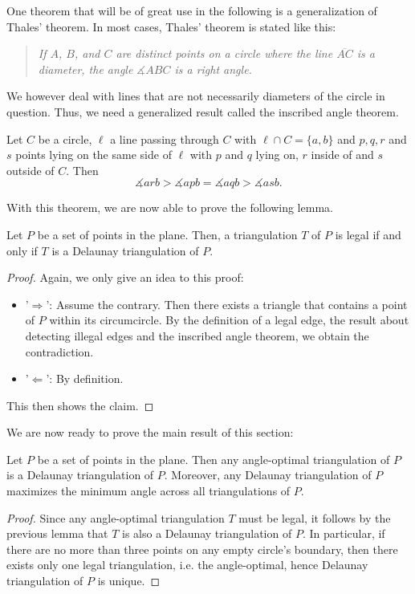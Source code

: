     One theorem that will be of great use in the following is a generalization of Thales' theorem. In most cases, Thales' theorem is stated like this:
    \begin{quote}
        \textit{
        If $A$, $B$, and $C$ are distinct points on a circle where the line $\overline{AC}$ is a diameter, the angle $\measuredangle ABC$ is a right angle.}
    \end{quote}
    We however deal with lines that are not necessarily diameters of the circle in question. Thus, we need a generalized result called the inscribed angle theorem.
    \begin{theorem} 
        Let $C$ be a circle, $\ell$ a line passing through $C$ with $\ell \cap C = \{a, b\}$ and $p, q ,r$ and $s$ points lying on the same side of $\ell$ with $p$ and $q$ lying on, $r$ inside of and $s$ outside of $C$. Then 
        $$\measuredangle arb > \measuredangle apb = \measuredangle aqb > \measuredangle asb .$$
    \end{theorem}

    With this theorem, we are now able to prove the following lemma.

    \begin{lemma}
        Let $P$ be a set of points in the plane. Then, a triangulation $T$ of $P$ is legal if and only if $T$ is a Delaunay triangulation of $P$.
    \end{lemma}
    \begin{proof} 
        Again, we only give an idea to this proof: 
        \begin{itemize}
            \item[] '$\Rightarrow$': Assume the contrary. Then there exists a triangle that contains a point of $P$ within its circumcircle. By the definition of a legal edge, the result about detecting illegal edges and the inscribed angle theorem, we obtain the contradiction.
            
            \item[] '$\Leftarrow$': By definition.
        \end{itemize}
        This then shows the claim.
    \end{proof}

    We are now ready to prove the main result of this section:

    \begin{theorem}
        Let $P$ be a set of points in the plane. Then any angle-optimal triangulation of $P$ is a Delaunay triangulation of $P$. Moreover, any Delaunay triangulation of $P$ maximizes the minimum angle across all triangulations of $P$. 
    \end{theorem}
    \begin{proof} 
        Since any angle-optimal triangulation $T$ must be legal, it follows by the previous lemma that $T$ is also a Delaunay triangulation of $P$. In particular, if there are no more than three points on any empty circle's boundary, then there exists only one legal triangulation, i.e. the angle-optimal, hence Delaunay triangulation of $P$ is unique.
    \end{proof}

